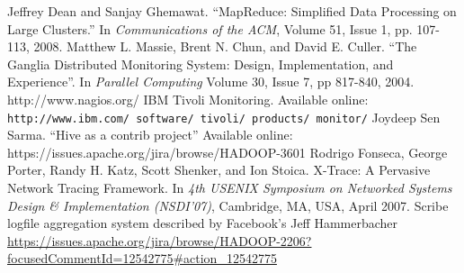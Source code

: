\documentclass[letterpaper,twocolumn,10pt]{article}
\begin{document}
\begin{thebibliography}{99}

Jeffrey Dean and Sanjay Ghemawat. ``MapReduce: Simplified Data Processing on Large Clusters.'' \newblock In \textit{Communications of the ACM}, Volume 51, Issue 1, pp. 107-113, 2008.
Matthew L. Massie, Brent N. Chun, and David E. Culler.  ``The Ganglia Distributed Monitoring System: Design, Implementation, and Experience''.
\newblock In \textit{Parallel Computing} Volume 30, Issue 7, pp 817-840, 2004.
http://www.nagios.org/
IBM Tivoli Monitoring.
\newblock Available online: \texttt{http://www.ibm.com/ software/ tivoli/ products/ monitor/}
Joydeep Sen Sarma.  ``Hive as a contrib project''
\newblock Available online: https://issues.apache.org/jira/browse/HADOOP-3601
Rodrigo Fonseca, George Porter, Randy H. Katz, Scott Shenker, and Ion Stoica.  X-Trace: A Pervasive Network Tracing Framework.
\newblock In \textit{4th USENIX Symposium on Networked Systems Design \& Implementation (NSDI'07)}, Cambridge, MA, USA, April 2007.
Scribe logfile aggregation system described by Facebook's Jeff Hammerbacher
\url{https://issues.apache.org/jira/browse/HADOOP-2206?focusedCommentId=12542775#action_12542775}

\end{thebibliography}
\end{document}
